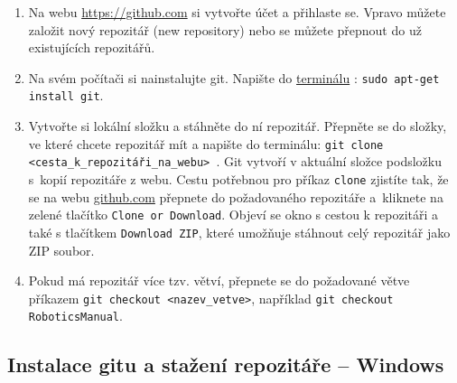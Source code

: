 \begin{enumerate}
	\item Na webu \url{https://github.com} si vytvořte účet a přihlaste se. 
	Vpravo můžete založit nový repozitář (new repository) nebo se můžete přepnout do už existujících repozitářů. 
	
	\item Na svém počítači si nainstalujte git. Napište do 
	\hyperref[terminal]{terminálu} : {\tt sudo apt-get install git}. 
	
	\item Vytvořte si lokální složku a stáhněte do ní repozitář.  
	Přepněte se do složky, ve které chcete repozitář mít a napište do terminálu: 
	{\tt git clone <cesta\_k\_repozitáři\_na\_webu> }. 
	Git vytvoří v aktuální složce podsložku s~kopií repozitáře z webu.  
	Cestu potřebnou pro příkaz {\tt clone} zjistíte tak, 
	že se na webu \url{github.com} přepnete do požadovaného repozitáře a~kliknete na zelené tlačítko {\tt Clone or Download}.
	Objeví se okno s cestou k repozitáři a také s tlačítkem {\tt Download ZIP}, které umožňuje stáhnout celý repozitář jako ZIP soubor.
	
	\item Pokud má repozitář více tzv. větví, přepnete se do požadované větve příkazem 
	{\tt git checkout <nazev\_vetve>}, například {\tt git checkout RoboticsManual}.
\end{enumerate}

\subsection{Instalace gitu a stažení repozitáře -- Windows}

